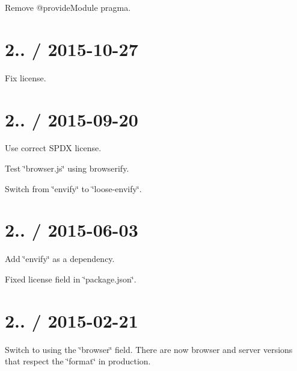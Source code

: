 \begin{DoxyItemize}
\item Remove {\ttfamily @provide\+Module} pragma.
\end{DoxyItemize}

\section*{2.. / 2015-\/10-\/27 }


\begin{DoxyItemize}
\item Fix license.
\end{DoxyItemize}

\section*{2.. / 2015-\/09-\/20 }


\begin{DoxyItemize}
\item Use correct S\+P\+DX license.
\item Test \char`\"{}browser.\+js\char`\"{} using browserify.
\item Switch from \char`\"{}envify\char`\"{} to \char`\"{}loose-\/envify\char`\"{}.
\end{DoxyItemize}

\section*{2.. / 2015-\/06-\/03 }


\begin{DoxyItemize}
\item Add \char`\"{}envify\char`\"{} as a dependency.
\item Fixed license field in \char`\"{}package.\+json\char`\"{}.
\end{DoxyItemize}

\section*{2.. / 2015-\/02-\/21 }


\begin{DoxyItemize}
\item Switch to using the \char`\"{}browser\char`\"{} field. There are now browser and server versions that respect the \char`\"{}format\char`\"{} in production.
\end{DoxyItemize}

